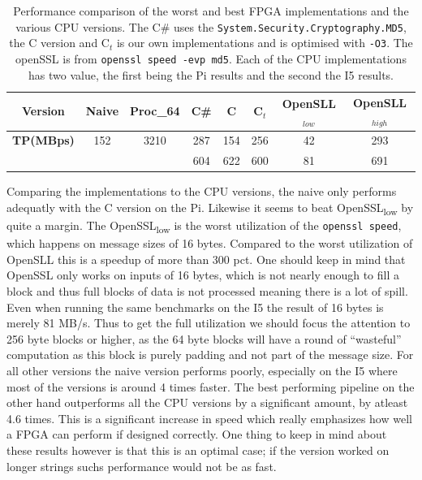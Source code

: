 \documentclass[a4paper]{article}
\begin{document}
\begin{table}[!htb]
\centering
\captionsetup{width=.8\linewidth}
\begin{tabular}{c c c c c c c c}
\hline
\textbf{Version} & Naive & Proc_{64} & C\# & C & C$_{t}$ & OpenSLL$_{low}$ & OpenSLL$_{high}$\\
\hline
\textbf{TP(MBps)} & 152 & 3210 & 287 & 154 & 256 & 42 & 293\\
 & & & 604 & 622 & 600 & 81 & 691
\end{tabular}
\caption[MD5-versions]%
{Performance comparison of the worst and best FPGA implementations and the various CPU versions. The C\# uses the \texttt{System.Security.Cryptography.MD5}, the C version and C$_t$ is our own implementations and is optimised with \texttt{-O3}. The openSSL is from \texttt{openssl speed -evp md5}. Each of the CPU implementations has two value, the first being the Pi results and the second the I5 results.}
\label{tab:MD5compare}
\end{table}
Comparing the implementations to the CPU versions, the naive only performs adequatly with the C version on the Pi. Likewise it seems to beat OpenSSL\textsubscript{low} by quite a margin. The OpenSSL\textsubscript{low} is the worst utilization of the \texttt{openssl speed}, which happens on message sizes of 16 bytes. Compared to the worst utilization of OpenSLL this is a speedup of more than 300 pct. One should keep in mind that OpenSSL only works on inputs of 16 bytes, which is not nearly enough to fill a block and thus full blocks of data is not processed meaning there is a lot of spill. Even when running the same benchmarks on the I5 the result of 16 bytes is merely 81 MB/s. Thus to get the full utilization we should focus the attention to 256 byte blocks or higher, as the 64 byte blocks will have a round of ``wasteful'' computation as this block is purely padding and not part of the message size.
For all other versions the naive version performs poorly, especially on the I5 where most of the versions is around 4 times faster. The best performing pipeline on the other hand outperforms all the CPU versions by a significant amount, by atleast 4.6 times. This is a significant increase in speed which really emphasizes how well a FPGA can perform if designed correctly. One thing to keep in mind about these results however is that this is an optimal case; if the version worked on longer strings suchs performance would not be as fast.
\end{document}
